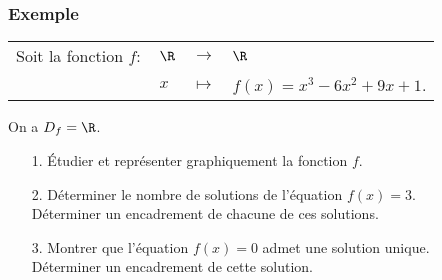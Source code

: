 \subsubsection{Exemple}

\begin{tabular}{llll}
\hspace*{-.3cm} Soit la fonction $f:$ & $\R$ & $\longrightarrow$ & $\R$ \\
& $x$ & $\longmapsto$ & $f(x) = x^3 - 6x^2 + 9x + 1$. \\
\end{tabular}

\vspace*{.3cm}

On a $D_f = \R$. \\

\begin{itemize}
\item[1.] Étudier et représenter graphiquement la fonction $f$. \\
\item[2.] Déterminer le nombre de solutions de l'équation $f(x) = 3$. \\ Déterminer un encadrement de chacune de ces solutions. \\
\item[3.] Montrer que l'équation $f(x) = 0$ admet une solution unique. \\ Déterminer un encadrement de cette solution. \\
\end{itemize}

\vspace*{-.1cm}

